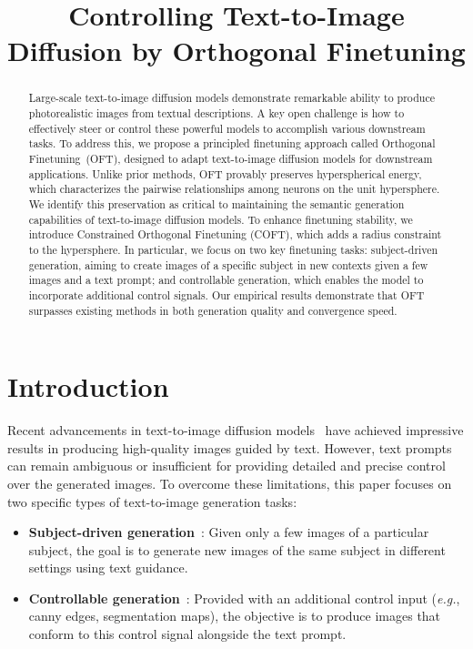 \title{Controlling Text-to-Image Diffusion by Orthogonal Finetuning}

\begin{abstract}
Large-scale text-to-image diffusion models demonstrate remarkable ability to produce photorealistic images from textual descriptions. A key open challenge is how to effectively steer or control these powerful models to accomplish various downstream tasks. To address this, we propose a principled finetuning approach called Orthogonal Finetuning~(OFT), designed to adapt text-to-image diffusion models for downstream applications. Unlike prior methods, OFT provably preserves hyperspherical energy, which characterizes the pairwise relationships among neurons on the unit hypersphere. We identify this preservation as critical to maintaining the semantic generation capabilities of text-to-image diffusion models. To enhance finetuning stability, we introduce Constrained Orthogonal Finetuning (COFT), which adds a radius constraint to the hypersphere. In particular, we focus on two key finetuning tasks: subject-driven generation, aiming to create images of a specific subject in new contexts given a few images and a text prompt; and controllable generation, which enables the model to incorporate additional control signals. Our empirical results demonstrate that OFT surpasses existing methods in both generation quality and convergence speed.
\end{abstract}

\section{Introduction}

Recent advancements in text-to-image diffusion models~\cite{saharia2022photorealistic,ramesh2022hierarchical,rombach2022high} have achieved impressive results in producing high-quality images guided by text. However, text prompts can remain ambiguous or insufficient for providing detailed and precise control over the generated images. To overcome these limitations, this paper focuses on two specific types of text-to-image generation tasks:

\begin{itemize}[leftmargin=*,nosep]

    \item \textbf{Subject-driven generation}~\cite{ruiz2023dreambooth}: Given only a few images of a particular subject, the goal is to generate new images of the same subject in different settings using text guidance.
    \item \textbf{Controllable generation}~\cite{zhang2023adding,mou2023t2i}: Provided with an additional control input (\emph{e.g.}, canny edges, segmentation maps), the objective is to produce images that conform to this control signal alongside the text prompt.
\end{itemize}

